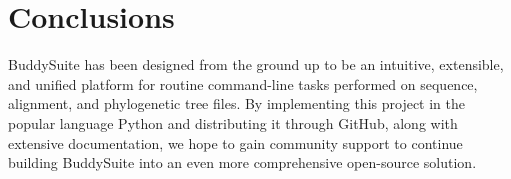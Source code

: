 \documentclass[twocolumn]{bmcart}%
\begin{document}
\section*{Conclusions}
BuddySuite has been designed from the ground up to be an intuitive, extensible, and unified platform for routine command-line tasks performed on sequence, alignment, and phylogenetic tree files. By implementing this project in the popular language Python and distributing it through GitHub, along with extensive documentation, we hope to gain community support to continue building BuddySuite into an even more comprehensive open-source solution.


\end{document}
